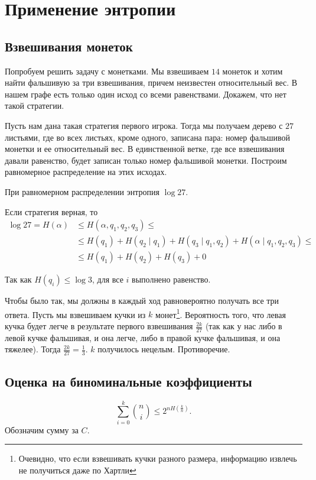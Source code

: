 \section{Применение энтропии}
\subsection{Взвешивания монеток}
Попробуем решить задачу с монетками. Мы взвешиваем $ 14$ монеток и хотим найти фальшивую за три взвешивания, причем неизвестен относительный вес. В нашем графе есть только один исход со всеми равенствами. Докажем, что нет такой стратегии.

Пусть нам дана такая стратегия первого игрока.
Тогда мы получаем дерево с $ 27$ листьями, где во всех листьях, кроме одного, записана пара:
номер фальшивой монетки и ее относительный вес.
В единственной ветке, где все взвешивания давали равенство, будет записан только номер фальшивой монетки.
Построим равномерное распределение на этих исходах.

При равномерном распределении энтропия $ \log 27$.

Если стратегия верная, то
\begin{align*}
\log 27 = H(\alpha) &\le  H( \alpha, q_1, q_2, q_3) \le \\ &\le H( q_1 ) + H(q_{2} \mid q_1 )+ H(q_3 \mid q_1, q_2)+ H( \alpha  \mid q_1, q_2, q_3 ) \le \tag{Chain rule}\\  
			& \le  H(q_1) + H(q_2) + H(q_3) + 0
\end{align*}

Так как $ H(q_i) \le  \log 3$, для все $ i$ выполнено равенство.

Чтобы было так, мы должны в каждый ход равновероятно получать все три ответа.
Пусть мы взвешиваем кучки из $ k$ монет\footnote{Очевидно, что если взвешивать кучки разного размера, информацию извлечь не получиться даже по Хартли}. 
Вероятность того, что левая кучка будет легче в результате первого взвешивания $\frac{2k}{27}$ (так как у нас либо в левой кучке фальшивая, и она легче, либо в правой кучке фальшивая, и она тяжелее). Тогда $\frac{2k}{27} = \frac{1}{3}$. $k$ получилось нецелым.
Противоречие.

\subsection{Оценка на биноминальные коэффициенты}
\[
	\sum_{i=0}^{k} {n \choose i} \le  2^{n H(\frac{k}{n})}
.\] 
Обозначим сумму за $ C$.


